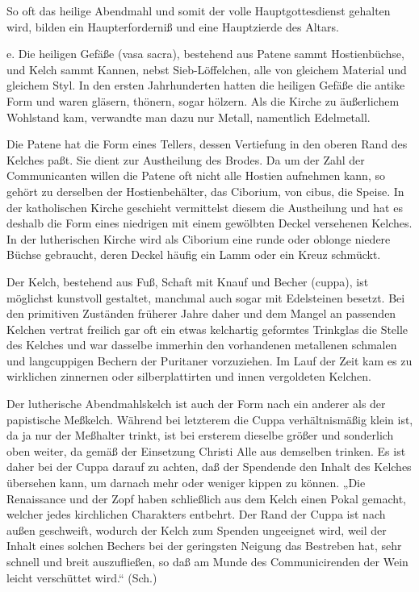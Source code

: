 So oft das heilige Abendmahl und somit der volle Hauptgottesdienst gehalten wird, bilden ein Haupterforderniß und eine Hauptzierde des Altars.

e. Die heiligen Gefäße (vasa sacra), bestehend aus Patene sammt Hostienbüchse, und Kelch sammt Kannen, nebst Sieb-Löffelchen, alle von gleichem Material und gleichem Styl. In den ersten Jahrhunderten hatten die heiligen Gefäße die antike Form und waren gläsern, thönern, sogar hölzern. Als die Kirche zu äußerlichem Wohlstand kam, verwandte man dazu nur Metall, namentlich Edelmetall.

Die Patene hat die Form eines Tellers, dessen Vertiefung in den oberen Rand des Kelches paßt. Sie dient zur Austheilung des Brodes. Da um der Zahl der Communicanten willen die Patene oft nicht alle Hostien aufnehmen kann, so gehört zu derselben der Hostienbehälter, das Ciborium, von cibus, die Speise. In der katholischen Kirche geschieht vermittelst diesem die Austheilung und hat es deshalb die Form eines niedrigen mit einem gewölbten Deckel versehenen Kelches. In der lutherischen Kirche wird als Ciborium eine runde oder oblonge niedere Büchse gebraucht, deren Deckel häufig ein Lamm oder ein Kreuz schmückt.

Der Kelch, bestehend aus Fuß, Schaft mit Knauf und Becher (cuppa), ist möglichst kunstvoll gestaltet, manchmal auch sogar mit Edelsteinen besetzt. Bei den primitiven Zuständen früherer Jahre daher und dem Mangel an passenden Kelchen vertrat freilich gar oft ein etwas kelchartig geformtes Trinkglas die Stelle des Kelches und war dasselbe immerhin den vorhandenen metallenen schmalen und langcuppigen Bechern der Puritaner vorzuziehen. Im Lauf der Zeit kam es zu wirklichen zinnernen oder silberplattirten und innen vergoldeten Kelchen.

Der lutherische Abendmahlskelch ist auch der Form nach ein anderer als der papistische Meßkelch. Während bei letzterem die Cuppa verhältnismäßig klein ist, da ja nur der Meßhalter trinkt, ist bei ersterem dieselbe größer und sonderlich oben weiter, da gemäß der Einsetzung Christi Alle aus demselben trinken. Es ist daher bei der Cuppa darauf zu achten, daß der Spendende den Inhalt des Kelches übersehen kann, um darnach mehr oder weniger kippen zu können. „Die Renaissance und der Zopf haben schließlich aus dem Kelch einen Pokal gemacht, welcher jedes kirchlichen Charakters entbehrt. Der Rand der Cuppa ist nach außen geschweift, wodurch der Kelch zum Spenden ungeeignet wird, weil der Inhalt eines solchen Bechers bei der geringsten Neigung das Bestreben hat, sehr schnell und breit auszufließen, so daß am Munde des Communicirenden der Wein leicht verschüttet wird.“ (Sch.)

